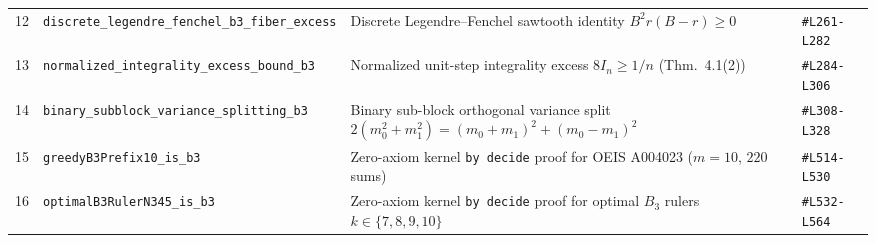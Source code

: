\documentclass[11pt,a4paper]{article}
\theoremstyle{remark}
\begin{document}
\begin{table}[htbp]
{\begin{tabular}{clll}
    12 & \texttt{discrete\_legendre\_fenchel\_b3\_fiber\_excess} & Discrete Legendre--Fenchel sawtooth identity $B^2 r(B-r) \ge 0$ & \texttt{\#L261-L282} \\
    13 & \texttt{normalized\_integrality\_excess\_bound\_b3} & Normalized unit-step integrality excess $8 I_n \ge 1/n$ (Thm.~4.1(2)) & \texttt{\#L284-L306} \\
    14 & \texttt{binary\_subblock\_variance\_splitting\_b3} & Binary sub-block orthogonal variance split $2(m_0^2+m_1^2)=(m_0+m_1)^2+(m_0-m_1)^2$ & \texttt{\#L308-L328} \\
    15 & \texttt{greedyB3Prefix10\_is\_b3} & Zero-axiom kernel \texttt{by decide} proof for OEIS A004023 ($m = 10$, $220$ sums) & \texttt{\#L514-L530} \\
    16 & \texttt{optimalB3RulerN345\_is\_b3} & Zero-axiom kernel \texttt{by decide} proof for optimal $B_3$ rulers $k \in \{7,8,9,10\}$ & \texttt{\#L532-L564} \\
    \bottomrule
  \end{tabular}%
  }
  \label{tab:lean4}
\end{table}



\end{document}
